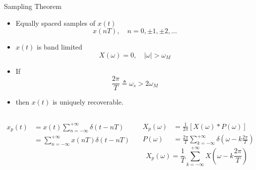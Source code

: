 \begin{frame}{Sampling Theorem}
    \begin{itemize}
        \item Equally spaced samples of $x(t)$
        \begin{equation*}
            x(nT), \quad n=0, \pm 1, \pm 2, \dots
        \end{equation*}
        \item $x(t)$ is band limited
        \begin{equation*}
            X(\omega) = 0,\quad  |\omega| > \omega_M
        \end{equation*}
        \item If
        \begin{equation*}
            \frac{2\pi}{T} \triangleq \omega_s > 2\omega_M
        \end{equation*}
        \item then $x(t)$ is uniquely recoverable.
    \end{itemize}
\end{frame}



\begin{frame}{}
\begin{columns}
    \begin{column}{2.5in}
        {
        }

            \begin{align*}
                x_p(t) &= x(t)\sum_{n=-\infty}^{+\infty} \delta(t - nT)\\
                &= \sum_{n=-\infty}^{+\infty} x(nT)\delta(t - nT)
            \end{align*}
    \end{column}
    \begin{column}{2.5in}
        \pause
        \begin{align*}
            X_p(\omega)  &= \frac{1}{2\pi} \left[X(\omega)\ast P(\omega)\right]\\
            P(\omega) &= \frac{2\pi}{T} \sum_{k=-\infty}^{+\infty}\delta\left(\omega- k\frac{2\pi}{T}\right)
        \end{align*}
        \pause
        \begin{equation*}
            X_p(\omega) = \frac{1}{T}\sum_{k=-\infty}^{+\infty} X\left(\omega- k\frac{2\pi}{T}\right)
        \end{equation*}
    \end{column}
\end{columns}
\end{frame}

